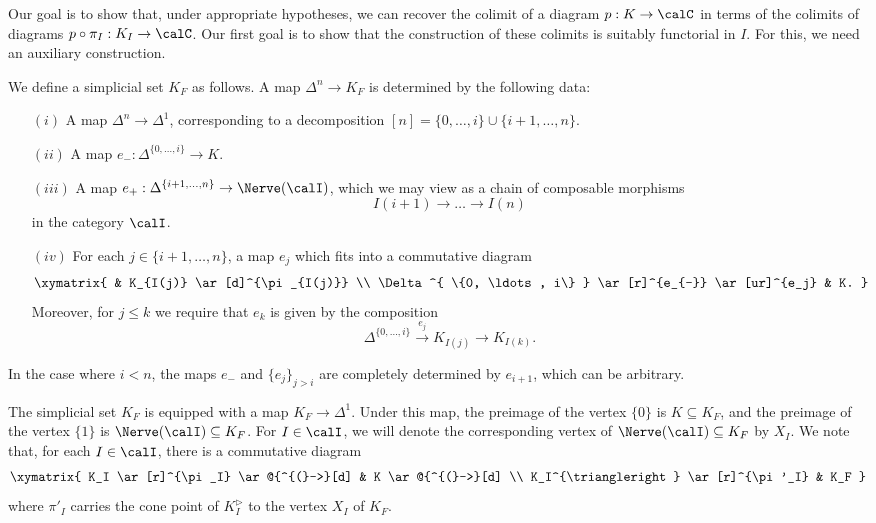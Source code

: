 Our goal is to show that, under appropriate hypotheses, we can recover the colimit
of a diagram $p: K \rightarrow \calC$ in terms of the colimits of diagrams
$p \circ \pi_I: K_I \rightarrow \calC$. Our first goal is to show that the construction of these colimits is suitably functorial in $I$. For this, we need an auxiliary construction.

\begin{notation}\label{nixx}
We define a simplicial set $K_{F}$ as follows. A map $\Delta^n \rightarrow K_{F}$
is determined by the following data:

\begin{itemize}
\item[$(i)$] A map $\Delta^{n} \rightarrow \Delta^{1}$, corresponding to a decomposition
$[n] = \{ 0, \ldots, i \} \cup \{ i+1, \ldots, n\}$.

\item[$(ii)$] A map $e_{-}: \Delta^{ \{ 0, \ldots, i\} } \rightarrow K$.

\item[$(iii)$] A map $e_{+}: \Delta^{\{ i+1, \ldots, n\} } \rightarrow \Nerve(\calI)$, which we may view as a chain of composable morphisms
$$ I(i+1) \rightarrow \ldots \rightarrow I(n)$$
in the category $\calI$.

\item[$(iv)$] For each $j \in \{i+1, \ldots, n\}$, a map
$e_{j}$ which fits into a commutative diagram
$$ \xymatrix{ & K_{I(j)} \ar[d]^{\pi_{I(j)}} \\
\Delta^{ \{0, \ldots, i\} } \ar[r]^{e_{-}} \ar[ur]^{e_j} & K. }$$
Moreover, for $j \leq k$ we require that
$e_k$ is given by the composition
$$ \Delta^{ \{0, \ldots, i\} } \stackrel{ e_j }{\rightarrow} 
K_{I(j)} \rightarrow K_{I(k)}.$$
\end{itemize}
\end{notation}

\begin{remark}
In the case where $i < n$, the maps $e_{-}$ and $\{ e_j \}_{j > i}$ are completely
determined by $e_{i+1}$, which can be arbitrary.
\end{remark}

The simplicial set $K_{F}$ is equipped with a map $K_{F} \rightarrow \Delta^1$. Under this map, the preimage of the vertex $\{0\}$ is $K \subseteq K_{F}$, and the preimage of the vertex $\{1\}$
is $\Nerve(\calI) \subseteq K_{F}$. For $I \in \calI$, we will denote the
corresponding vertex of $\Nerve(\calI) \subseteq K_F$ by $X_I$. We
note that, for each $I \in \calI$, there is a commutative diagram
$$ \xymatrix{ K_I \ar[r]^{\pi_I} \ar@{^{(}->}[d] & K \ar@{^{(}->}[d] \\
K_I^{\triangleright} \ar[r]^{\pi'_I} & K_F }$$
where $\pi'_I$ carries the cone point of $K_I^{\triangleright}$ to
the vertex $X_I$ of $K_F$.

